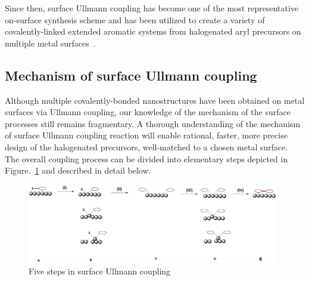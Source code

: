 \documentclass[aps,reprint,amsmath,amssymb]{revtex4-2}
\begin{document}
Since then, surface Ullmann coupling has become one of the most representative on-surface synthesis scheme and has been utilized to create a variety of covalently-linked extended aromatic systems from halogenated aryl precursors on multiple metal surfaces~\cite{ullmann_34}. 


\subsection{Mechanism of surface Ullmann coupling}

Although multiple covalently-bonded nanostructures have been obtained on metal surfaces via Ullmann coupling, our knowledge of the mechanism of the surface processes still remains fragmentary. 
%
A thorough understanding of the mechanism of surface Ullmann coupling reaction will enable rational, faster, more precise design of the halogenated precursors, well-matched to a chosen metal surface.
%
The overall coupling process can be divided into elementary steps depicted in Figure.~\ref{fig_mecha} and described in detail below.

\begin{figure}[htb]
\centering
\includegraphics[width=0.98\textwidth]{Fig/mechanism.png}
\caption{Five steps in surface Ullmann coupling}
\label{fig_mecha}
\end{figure}
\end{document}
